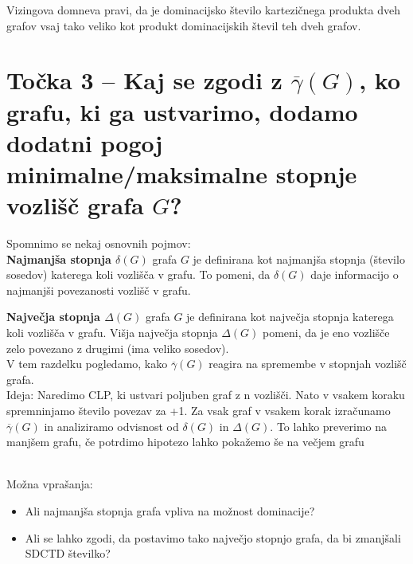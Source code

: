 \documentclass[a4paper, 12pt]{article}
\begin{document}
Vizingova domneva pravi, da je dominacijsko število kartezičnega produkta dveh grafov vsaj tako veliko kot produkt dominacijskih števil teh dveh grafov.







\newpage
\section*{Točka 3 –  Kaj se zgodi z $\overline\gamma(G)$, ko grafu, ki ga ustvarimo, dodamo dodatni pogoj minimalne/maksimalne stopnje vozlišč grafa \( G \)?}

Spomnimo se nekaj osnovnih pojmov: \\
\textbf{Najmanjša stopnja \( \delta(G) \)} grafa \( G \) je definirana kot najmanjša stopnja (število sosedov) katerega koli vozlišča v grafu. To pomeni, da \( \delta(G) \) daje informacijo o najmanjši povezanosti vozlišč v grafu. 

\textbf{ Največja stopnja \( \Delta(G) \)} grafa \( G \) je definirana kot največja stopnja katerega koli vozlišča v grafu. Višja največja stopnja \( \Delta(G) \) pomeni, da je eno vozlišče zelo povezano z drugimi (ima veliko sosedov). \\

V tem razdelku pogledamo, kako \( \overline{\gamma}(G) \) reagira na spremembe v stopnjah vozlišč grafa. \\
Ideja: Naredimo CLP, ki ustvari poljuben graf z n vozlišči. Nato v vsakem koraku spremninjamo število povezav za +1. Za vsak graf v vsakem korak izračunamo \(\overline{\gamma}(G) \) in analiziramo odvisnost od \( \delta(G) \) in \( \Delta(G)\). To lahko preverimo na manjšem grafu, če potrdimo hipotezo lahko pokažemo še na večjem grafu

\\

 Možna vprašanja:
\begin{itemize}
    \item Ali najmanjša stopnja grafa vpliva na možnost dominacije? 
    \item Ali se lahko zgodi, da postavimo tako največjo stopnjo grafa, da bi zmanjšali SDCTD številko?
\end{itemize}

\\
\end{document}
